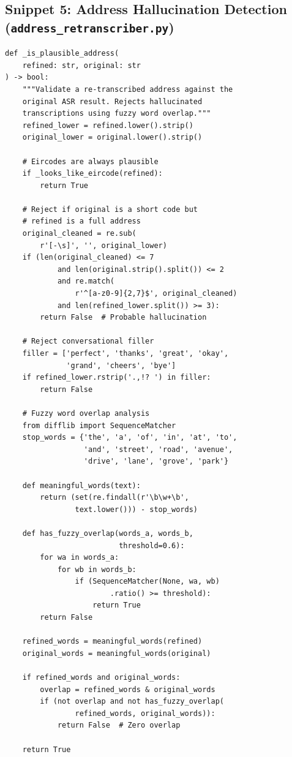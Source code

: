 \documentclass[conference]{IEEEtran}
\begin{document}
\subsection*{Snippet 5: Address Hallucination Detection (\texttt{address\_retranscriber.py})}
\begin{lstlisting}[caption={Validation of re-transcribed addresses against original ASR output}]
def _is_plausible_address(
    refined: str, original: str
) -> bool:
    """Validate a re-transcribed address against the
    original ASR result. Rejects hallucinated
    transcriptions using fuzzy word overlap."""
    refined_lower = refined.lower().strip()
    original_lower = original.lower().strip()

    # Eircodes are always plausible
    if _looks_like_eircode(refined):
        return True

    # Reject if original is a short code but
    # refined is a full address
    original_cleaned = re.sub(
        r'[-\s]', '', original_lower)
    if (len(original_cleaned) <= 7
            and len(original.strip().split()) <= 2
            and re.match(
                r'^[a-z0-9]{2,7}$', original_cleaned)
            and len(refined_lower.split()) >= 3):
        return False  # Probable hallucination

    # Reject conversational filler
    filler = ['perfect', 'thanks', 'great', 'okay',
              'grand', 'cheers', 'bye']
    if refined_lower.rstrip('.,!? ') in filler:
        return False

    # Fuzzy word overlap analysis
    from difflib import SequenceMatcher
    stop_words = {'the', 'a', 'of', 'in', 'at', 'to',
                  'and', 'street', 'road', 'avenue',
                  'drive', 'lane', 'grove', 'park'}

    def meaningful_words(text):
        return (set(re.findall(r'\b\w+\b',
                text.lower())) - stop_words)

    def has_fuzzy_overlap(words_a, words_b,
                          threshold=0.6):
        for wa in words_a:
            for wb in words_b:
                if (SequenceMatcher(None, wa, wb)
                        .ratio() >= threshold):
                    return True
        return False

    refined_words = meaningful_words(refined)
    original_words = meaningful_words(original)

    if refined_words and original_words:
        overlap = refined_words & original_words
        if (not overlap and not has_fuzzy_overlap(
                refined_words, original_words)):
            return False  # Zero overlap

    return True
\end{lstlisting}
\end{document}
